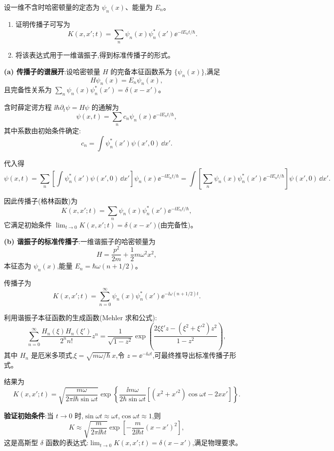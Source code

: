 \begin{question}
设一维不含时哈密顿量的定态为 $\psi_n(x)$、能量为 $E_n$。
\begin{enumerate}
\item 证明传播子可写为
\[
K(x,x';t)=\sum_n\psi_n(x)\psi_n^*(x')\ee^{-\ii E_nt/\hbar}.
\]
\item 将该表达式用于一维谐振子,得到标准传播子的形式。
\end{enumerate}
\begin{solution}
	\textbf{(a) 传播子的谱展开}:设哈密顿量 $H$ 的完备本征函数系为 $\{\psi_n(x)\}$,满足
	\[
	H\psi_n(x) = E_n\psi_n(x),
	\]
	且完备性关系为 $\sum_n \psi_n(x)\psi_n^*(x') = \delta(x-x')$。

	含时薛定谔方程 $\ii\hbar\partial_t\psi=H\psi$ 的通解为
	\[
	\psi(x,t) = \sum_n c_n\psi_n(x)\ee^{-\ii E_n t/\hbar},
	\]
	其中系数由初始条件确定:
	\[
	c_n = \int \psi_n^*(x')\psi(x',0)\,\dd x'.
	\]

	代入得
	\[
	\psi(x,t) = \sum_n \left[\int \psi_n^*(x')\psi(x',0)\,\dd x'\right]\psi_n(x)\ee^{-\ii E_n t/\hbar}
	= \int \left[\sum_n \psi_n(x)\psi_n^*(x')\ee^{-\ii E_n t/\hbar}\right] \psi(x',0)\,\dd x'.
	\]

	因此传播子(格林函数)为
	\[
	K(x,x';t) = \sum_n \psi_n(x)\psi_n^*(x')\ee^{-\ii E_n t/\hbar},
	\]
	它满足初始条件 $\lim_{t\to0} K(x,x';t)=\delta(x-x')$(由完备性)。

	\textbf{(b) 谐振子的标准传播子}:一维谐振子的哈密顿量为
	\[
	H = \frac{p^2}{2m} + \frac12 m\omega^2 x^2,
	\]
	本征态为 $\psi_n(x)$,能量 $E_n = \hbar\omega(n+1/2)$。

	传播子为
	\[
	K(x,x';t) = \sum_{n=0}^\infty \psi_n(x)\psi_n^*(x') \ee^{-\ii\omega(n+1/2)t}.
	\]

	利用谐振子本征函数的生成函数(Mehler 求和公式):
	\[
	\sum_{n=0}^\infty \frac{H_n(\xi)H_n(\xi')}{2^n n!}z^n = \frac{1}{\sqrt{1-z^2}}\exp\!\left(\frac{2\xi\xi'z-(\xi^2+\xi'^2)z^2}{1-z^2}\right),
	\]
	其中 $H_n$ 是厄米多项式,$\xi = \sqrt{m\omega/\hbar}\,x$,令 $z=\ee^{-\ii\omega t}$,可最终推导出标准传播子形式。

	结果为
	\[
	\boxed{K(x,x';t) = \sqrt{\frac{m\omega}{2\pi\ii\hbar\sin\omega t}}
	\exp\!\left\{\frac{\ii m\omega}{2\hbar\sin\omega t}
	\left[(x^2+x'^2)\cos\omega t - 2xx'\right]\right\}}.
	\]

	\textbf{验证初始条件}:当 $t\to0$ 时,$\sin\omega t \approx \omega t$,$\cos\omega t \approx 1$,则
	\[
	K \approx \sqrt{\frac{m}{2\pi\ii\hbar t}} \exp\!\left[-\frac{m}{2\ii\hbar t}(x-x')^2\right],
	\]
	这是高斯型 $\delta$ 函数的表达式:$\lim_{t\to0} K(x,x';t) = \delta(x-x')$,满足物理要求。
	\end{solution}
\end{question}

